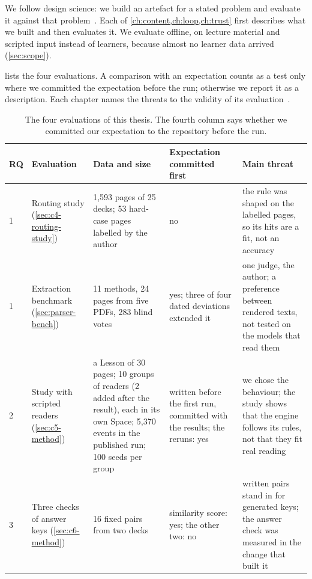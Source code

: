 We follow design science: we build an artefact for a stated problem and
evaluate it against that problem~\cite{hevner2004design}. Each of
\cref{ch:content,ch:loop,ch:trust} first describes what we built and then
evaluates it. We evaluate offline, on lecture material and scripted input
instead of learners, because almost no learner data arrived
(\cref{sec:scope}).

 lists the four evaluations. A comparison with an
expectation counts as a test only where we committed the expectation before
the run; otherwise we report it as a description. Each
chapter names the threats to the validity of its
evaluation~\cite{wohlin2012experimentation}.

\begin{table}[htbp]
  \centering\small
  \caption{The four evaluations of this thesis. The fourth column says
    whether we committed our expectation to the repository before the run.}
  \label{tab:evaluations}
  \newcommand*{\rr}{\raggedright\hspace{0pt}}
  \begin{tabular}{@{}p{}p{}p{}p{}p{}@{}}
    \toprule
    \textbf{RQ} &
      \rr \textbf{Evaluation} &
      \rr \textbf{Data and size} &
      \rr \textbf{Expectation committed first} &
      \rr \textbf{Main threat} \tabularnewline
    \midrule
    1 &
      \rr Routing study (\cref{sec:c4-routing-study}) &
      \rr 1{,}593 pages of 25 decks; 53 hard-case pages labelled by the author &
      \rr no &
      \rr the rule was shaped on the labelled pages, so its hits are a fit, not an accuracy \tabularnewline
    1 &
      \rr Extraction benchmark (\cref{sec:parser-bench}) &
      \rr 11 methods, 24 pages from five PDFs, 283 blind votes &
      \rr yes; three of four dated deviations extended it &
      \rr one judge, the author; a preference between rendered texts, not tested on the models that read them \tabularnewline
    2 &
      \rr Study with scripted readers (\cref{sec:c5-method}) &
      \rr a Lesson of 30 pages; 10 groups of readers (2 added after the result), each in its own Space; 5{,}370 events in the published run; 100 seeds per group &
      \rr written before the first run, committed with the results; the reruns: yes &
      \rr we chose the behaviour; the study shows that the engine follows its rules, not that they fit real reading \tabularnewline
    3 &
      \rr Three checks of answer keys (\cref{sec:c6-method}) &
      \rr 16 fixed pairs from two decks &
      \rr similarity score: yes; the other two: no &
      \rr written pairs stand in for generated keys; the answer check was measured in the change that built it \tabularnewline
    \bottomrule
  \end{tabular}
\end{table}

